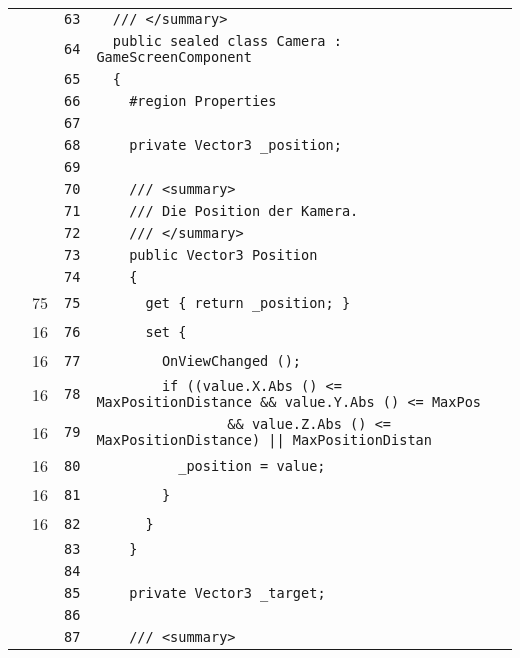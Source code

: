 \documentclass[a4paper,10pt]{article}
\begin{document}
\begin{longtable}[l]{lrrl}
\cellcolor{gray} &  & \verb~63~ & \verb~  /// </summary>~\\
\cellcolor{gray} &  & \verb~64~ & \verb~  public sealed class Camera : GameScreenComponent~\\
\cellcolor{gray} &  & \verb~65~ & \verb~  {~\\
\cellcolor{gray} &  & \verb~66~ & \verb~    #region Properties~\\
\cellcolor{gray} &  & \verb~67~ & \verb~~\\
\cellcolor{gray} &  & \verb~68~ & \verb~    private Vector3 _position;~\\
\cellcolor{gray} &  & \verb~69~ & \verb~~\\
\cellcolor{gray} &  & \verb~70~ & \verb~    /// <summary>~\\
\cellcolor{gray} &  & \verb~71~ & \verb~    /// Die Position der Kamera.~\\
\cellcolor{gray} &  & \verb~72~ & \verb~    /// </summary>~\\
\cellcolor{gray} &  & \verb~73~ & \verb~    public Vector3 Position~\\
\cellcolor{gray} &  & \verb~74~ & \verb~    {~\\
\cellcolor{green} & 75 & \verb~75~ & \verb~      get { return _position; }~\\
\cellcolor{green} & 16 & \verb~76~ & \verb~      set {~\\
\cellcolor{green} & 16 & \verb~77~ & \verb~        OnViewChanged ();~\\
\cellcolor{green} & 16 & \verb~78~ & \verb~        if ((value.X.Abs () <= MaxPositionDistance && value.Y.Abs () <= MaxPos~\\
\cellcolor{green} & 16 & \verb~79~ & \verb~                && value.Z.Abs () <= MaxPositionDistance) || MaxPositionDistan~\\
\cellcolor{green} & 16 & \verb~80~ & \verb~          _position = value;~\\
\cellcolor{green} & 16 & \verb~81~ & \verb~        }~\\
\cellcolor{green} & 16 & \verb~82~ & \verb~      }~\\
\cellcolor{gray} &  & \verb~83~ & \verb~    }~\\
\cellcolor{gray} &  & \verb~84~ & \verb~~\\
\cellcolor{gray} &  & \verb~85~ & \verb~    private Vector3 _target;~\\
\cellcolor{gray} &  & \verb~86~ & \verb~~\\
\cellcolor{gray} &  & \verb~87~ & \verb~    /// <summary>~\\

\end{longtable}
\end{document}

